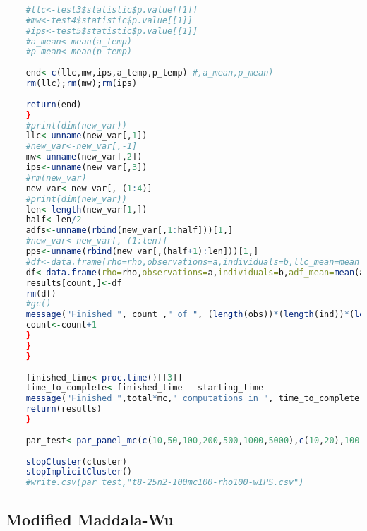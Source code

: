 \begin{lstlisting}[language=R]
	
	#llc<-test3$statistic$p.value[[1]]
	#mw<-test4$statistic$p.value[[1]]
	#ips<-test5$statistic$p.value[[1]]
	#a_mean<-mean(a_temp)
	#p_mean<-mean(p_temp)
	
	end<-c(llc,mw,ips,a_temp,p_temp) #,a_mean,p_mean)
	rm(llc);rm(mw);rm(ips)
	
	return(end)
	}
	#print(dim(new_var))
	llc<-unname(new_var[,1])
	#new_var<-new_var[,-1]
	mw<-unname(new_var[,2])
	ips<-unname(new_var[,3])
	#rm(new_var)
	new_var<-new_var[,-(1:4)]
	#print(dim(new_var))
	len<-length(new_var[1,])
	half<-len/2
	adfs<-unname(rbind(new_var[,1:half]))[1,]
	#new_var<-new_var[,-(1:len)]
	pps<-unname(rbind(new_var[,(half+1):len]))[1,]
	#df<-data.frame(rho=rho,observations=a,individuals=b,llc_mean=mean(llc),llc_sd=sqrt(var(llc)),mw_mean=mean(mw),mw_sd=sqrt(var(mw)),ips_mean=mean(ips),ips_sd=sqrt(var(ips)))
	df<-data.frame(rho=rho,observations=a,individuals=b,adf_mean=mean(adfs),adf_sd=sqrt(var(adfs)),pp_mean=mean(pps),pp_sd=sqrt(var(pps)),llc_mean=mean(llc),llc_sd=sqrt(var(llc)),mw_mean=mean(mw),mw_sd=sqrt(var(mw)),ips_mean=mean(ips),ips_sd=sqrt(var(ips)))
	results[count,]<-df
	rm(df)
	#gc()
	message("Finished ", count ," of ", (length(obs))*(length(ind))*(length(rho)))
	count<-count+1
	}
	}
	}
	
	finished_time<-proc.time()[[3]]
	time_to_complete<-finished_time - starting_time
	message("Finished ",total*mc," computations in ", time_to_complete)
	return(results)
	}
	
	par_test<-par_panel_mc(c(10,50,100,200,500,1000,5000),c(10,20),100,300)
	
	stopCluster(cluster)
	stopImplicitCluster()
	#write.csv(par_test,"t8-25n2-100mc100-rho100-wIPS.csv")
\end{lstlisting}

\subsection{Modified Maddala-Wu}

